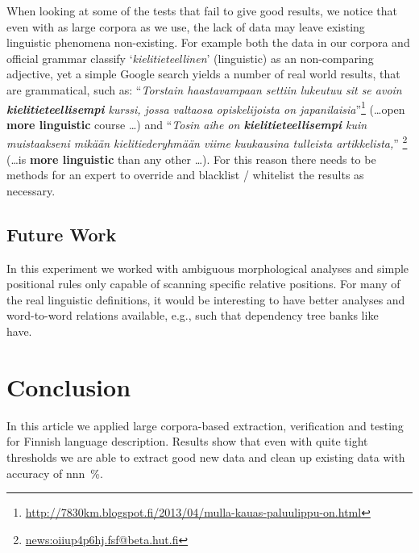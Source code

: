 \documentclass[a5paper]{article}
\begin{document}
When looking at some of the tests that fail to give good results, we notice
that even with as large corpora as we use, the lack of data may leave existing
linguistic phenomena non-existing. For example both the data in our corpora and
official grammar classify `\emph{kielitieteellinen}' (linguistic) as an
non-comparing adjective, yet a simple Google search yields a number of real
world results, that are grammatical, such as: ``\emph{Torstain haastavampaan
    settiin lukeutuu sit se avoin \textbf{kielitieteellisempi} kurssi, jossa
valtaosa opiskelijoista on
japanilaisia}''\footnote{\url{http://7830km.blogspot.fi/2013/04/mulla-kauas-paluulippu-on.html}}
(\ldots open \textbf{more linguistic} course \ldots) and ``\emph{Tosin aihe on
\textbf{kielitieteellisempi} kuin muistaakseni mikään kielitiederyhmään viime
kuukausina tulleista artikkelista,}''
\footnote{\url{news:oiiup4p6hj.fsf@beta.hut.fi}} (\ldots is \textbf{more
linguistic} than any other \ldots). For this reason there needs to be methods
for an expert to override and blacklist / whitelist the results as necessary.

\subsection{Future Work}

In this experiment we worked with ambiguous morphological analyses and simple
positional rules only capable of scanning specific relative
positions. For many of the real linguistic definitions, it would be interesting
to have better analyses and word-to-word relations available, e.g., such that
dependency tree banks like~\cite{haverinen2013building} have.

\section{Conclusion}

In this article we applied large corpora-based extraction, verification and
testing for Finnish language description. Results show that even with quite
tight thresholds we are able to extract good new data and clean up existing
data with accuracy of nnn~\%.



\end{document}
